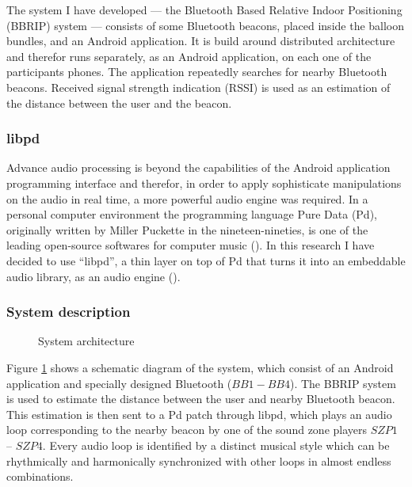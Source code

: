 \documentclass[a4paper,11pt]{article}
\newcommand{\noriinline}[1]{\todo[author=Nori,inline,color=green]{#1}}
\begin{document}
The system I have developed --- the Bluetooth Based Relative Indoor Positioning (BBRIP) system --- consists of some Bluetooth beacons, placed inside the balloon bundles, and an Android application.
It is build around distributed architecture and therefor runs separately, as an Android application, on each one of the participants phones.
The application repeatedly searches for nearby Bluetooth beacons.
Received signal strength indication (RSSI) is used as an estimation of the distance between the user and the beacon.

\subsubsection{libpd}\label{methods:libpd}

Advance audio processing is beyond the capabilities of the Android application programming interface and therefor, in order to apply sophisticate manipulations on the audio in real time, a more powerful audio engine was required.
In a personal computer environment the programming language Pure Data (Pd), originally written by Miller Puckette in the nineteen-nineties, is one of the leading open-source softwares for computer music (\citeauthor{web:pd}).
In this research I have decided to use ``libpd'', a thin layer on top of Pd that turns it into an embeddable audio library, as an audio engine (\cite[p. v]{brinkmann12}).

\subsubsection{System description}\label{systemdescription}



\begin{figure}[!htb]
	\centering
	\def\svgwidth{0.9\textwidth}
	
	\caption{System architecture}\label{fig:sys:architecture}
\end{figure}

Figure \ref{fig:sys:architecture} shows a schematic diagram of the system, which consist of an Android application and specially designed Bluetooth ($BB1 - BB4$).
The BBRIP system is used to estimate the distance between the user and nearby Bluetooth beacon.
This estimation is then sent to a Pd patch through libpd, which plays an audio loop corresponding to the nearby beacon by one of the sound zone players $SZP1$ -- $SZP4$.
Every audio loop is identified by a distinct musical style which can be rhythmically and harmonically synchronized with other loops in almost endless combinations.
\end{document}
